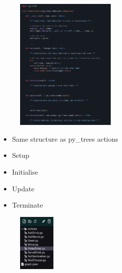 \documentclass[notes,slidesec,a4]{seminar}
\begin{document}
\begin{hslide}
\newpage
{}
\vspace{-0.6cm}
  \begin{minipage}[t]{5.5cm}
	\begin{center}
	\begin{figure}
		\includegraphics[width=4.9cm]{figs/screenshot4.png}
	\end{figure}
        \end{center}
  \end{minipage}
  \begin{minipage}[t]{6cm}
    \vspace{0.3cm}
    \begin{itemize}
    \item Same structure as py\_trees actions
    \item Setup
    \item Initialise
    \item Update
    \item Terminate
    \end{itemize}
\begin{center}
	\begin{figure}
		\includegraphics[width=1.8cm]{figs/BTStudio0.6-5.png}
	\end{figure}
        \end{center}
   \end{minipage}


\end{hslide}
\end{document}
